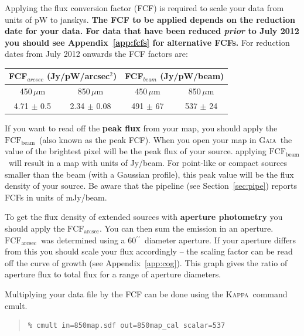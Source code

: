 \documentclass[twoside,11pt]{article}
\newcommand{\xref}[3]{#1}
\renewcommand{\_}{\texttt{\symbol{95}}}
\newcommand{\arcmin}{\mbox{$^\prime$}}
\newcommand{\arcsec}{\arcmin\hspace*{-0.1em}\arcmin}
\newenvironment{myquote}{\begin{quote}\begin{small}}{\end{small}\end{quote}}
\newcommand{\fcfb}{$\mathrm{FCF_{beam}}$}
\newcommand{\fcfa}{$\mathrm{FCF_{arcsec}}$}
\newcommand{\gaia}{\xref{\textsc{Gaia}}{sun214}{}}
\newcommand{\Kappa}{\xref{\textsc{Kappa}}{sun95}{}}
\newcommand{\task}[1]{\textsf{#1}}
\newcommand{\cmult}{\xref{\task{cmult}}{sun95}{CMULT}}
\begin{document}
Applying the flux conversion factor (FCF) is required to scale your
data from units of pW to janskys. \textbf{The FCF to be applied
depends on the reduction date for your data. For data that have been
reduced \emph{prior} to July 2012 you should see
Appendix~\ref{app:fcfs} for alternative FCFs.} For reduction dates
from July 2012 onwards the FCF factors are:
\begin{table}[h!]
\centering
\begin{tabular}{|c|c|c|c|}
 \hline
 \multicolumn{2}{|c|}{FCF$_{arcsec}$ (Jy/pW/arcsec$^2$) }  &
\multicolumn{2}{c|}{FCF$_{beam}$ (Jy/pW/beam)}      \\
\hline
\hspace{0.4cm} 450\,$\mu$m \hspace{0.3cm} & 850\,$\mu$m & \hspace{0.4cm} 450\,$\mu$m \hspace{0.3cm}& 850\,$\mu$m \\
 \hline
4.71 $\pm$ 0.5& 2.34 $\pm$ 0.08& 491 $\pm$ 67& 537 $\pm$ 24 \\
\hline
\end{tabular}
\end{table}

If you want to read off the \textbf{peak flux} from your map, you
should apply the \fcfb\ (also known as the peak FCF). When you open
your map in \gaia\ the value of the brightest pixel will be the peak
flux of your source. applying \fcfb\ will result in a map with units
of Jy/beam. For point-like or compact sources smaller than the beam
(with a Gaussian profile), this peak value will be the flux density of
your source. Be aware that the pipeline (see Section~\ref{sec:pipe})
reports FCFs in units of mJy/beam.

To get the flux density of extended sources with \textbf{aperture
photometry} you should apply the \fcfa.  You can then sum the emission
in an aperture. \fcfa\ was determined using a 60\arcsec\ diameter
aperture. If your aperture differs from this you should scale your
flux accordingly -- the scaling factor can be read off the curve of
growth (see Appendix~\ref{app:cog}). This graph gives the ratio of
aperture flux to total flux for a range of aperture diameters.

Multiplying your data file by the FCF can be done using the \Kappa\
command \cmult.
\begin{myquote}
\begin{verbatim}
% cmult in=850map.sdf out=850map_cal scalar=537
\end{verbatim}
\end{myquote}
\end{document}
